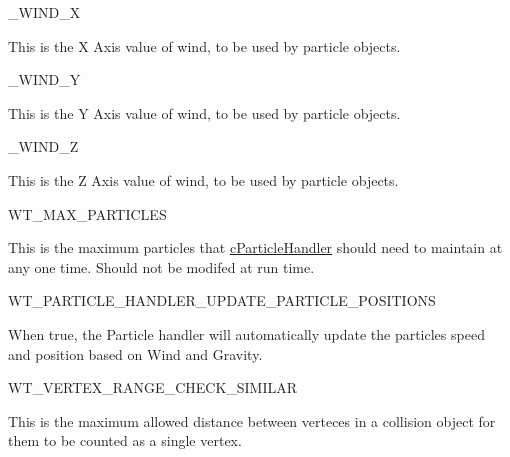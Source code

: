 \begin{DoxyItemize}
\item \_\-WIND\_\-X
\begin{DoxyItemize}
\item This is the X Axis value of wind, to be used by particle objects.
\end{DoxyItemize}
\end{DoxyItemize}
\begin{DoxyItemize}
\item \_\-WIND\_\-Y
\begin{DoxyItemize}
\item This is the Y Axis value of wind, to be used by particle objects.
\end{DoxyItemize}
\end{DoxyItemize}
\begin{DoxyItemize}
\item \_\-WIND\_\-Z
\begin{DoxyItemize}
\item This is the Z Axis value of wind, to be used by particle objects.
\end{DoxyItemize}
\end{DoxyItemize}
\begin{DoxyItemize}
\item WT\_\-MAX\_\-PARTICLES
\begin{DoxyItemize}
\item This is the maximum particles that \hyperlink{classc_particle_handler}{cParticleHandler} should need to maintain at any one time. Should not be modifed at run time.
\end{DoxyItemize}
\end{DoxyItemize}
\begin{DoxyItemize}
\item WT\_\-PARTICLE\_\-HANDLER\_\-UPDATE\_\-PARTICLE\_\-POSITIONS
\begin{DoxyItemize}
\item When true, the Particle handler will automatically update the particles speed and position based on Wind and Gravity.
\end{DoxyItemize}
\end{DoxyItemize}
\begin{DoxyItemize}
\item WT\_\-VERTEX\_\-RANGE\_\-CHECK\_\-SIMILAR
\begin{DoxyItemize}
\item This is the maximum allowed distance between verteces in a collision object for them to be counted as a single vertex.
\end{DoxyItemize}
\end{DoxyItemize}
